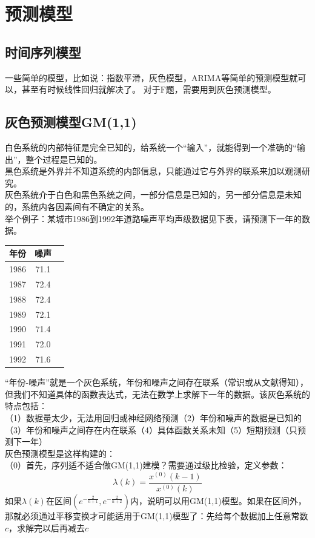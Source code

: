 \documentclass[11pt,a4paper]{article}
\begin{document}
\section{预测模型}
\subsection{时间序列模型}
一些简单的模型，比如说：指数平滑，灰色模型，ARIMA等简单的预测模型就可以，甚至有时候线性回归就解决了。
对于F题，需要用到灰色预测模型。
\subsection{灰色预测模型GM(1,1)}
\indent\setlength{\parindent}{2em}白色系统的内部特征是完全已知的，给系统一个“输入”，就能得到一个准确的“输出”，整个过程是已知的。\\
\indent\setlength{\parindent}{2em}黑色系统是外界并不知道系统的内部信息，只能通过它与外界的联系来加以观测研究。\\
\indent\setlength{\parindent}{2em}灰色系统介于白色和黑色系统之间，一部分信息是已知的，另一部分信息是未知的，系统内各因素间有不确定的关系。\\
\indent\setlength{\parindent}{2em}举个例子：某城市1986到1992年道路噪声平均声级数据见下表，请预测下一年的数据。\\
\begin{table}[h]
	\centering
	\begin{tabular}{ccc}
		\hline
		年份& 噪声 \\
		\hline
		1986 & 71.1 \\
		1987 & 72.4\\
		1988 & 72.4\\
		1989 & 72.1\\
		1990 & 71.4\\
		1991 & 72.0\\
		1992 & 71.6\\
		\hline
	\end{tabular}
\end{table}

\indent\setlength{\parindent}{2em}“年份-噪声”就是一个灰色系统，年份和噪声之间存在联系（常识或从文献得知），但我们不知道具体的函数表达式，无法在数学上求解下一年的数据。该灰色系统的特点包括：\\
（1）数据量太少，无法用回归或神经网络预测（2）年份和噪声的数据是已知的（3）年份和噪声之间存在内在联系（4）具体函数关系未知（5）短期预测（只预测下一年）\\

\noindent 灰色预测模型是这样构建的：\\
（0）首先，序列适不适合做GM(1,1)建模？需要通过级比检验，定义参数：
\begin{equation*}
	\lambda(k)=\dfrac{x^{(0)}(k-1)}{x^{(0)}(k)}
\end{equation*}
如果$\lambda(k)$在区间$(e^{-\frac{2}{n+1}}, e^{-\frac{2}{n+2}})$内，说明可以用GM(1,1)模型。如果在区间外，那就必须通过平移变换才可能适用于GM(1,1)模型了：先给每个数据加上任意常数$c$，求解完以后再减去$c$\\
\end{document}
